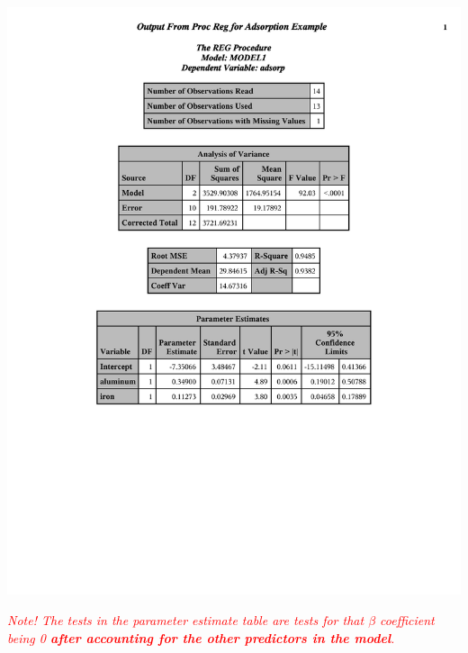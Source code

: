\documentclass{article}
\begin{document}
\begin{center}
\includegraphics[page=1,scale=0.55,trim = 20mm 70mm 20mm 0mm]{mlradexp}\\
\end{center}

\textit{\textcolor{red}{Note!  The tests in the parameter estimate table are tests for that $\beta$ coefficient being 0 \textbf{after accounting for the other predictors in the model}.}}
\end{document}
